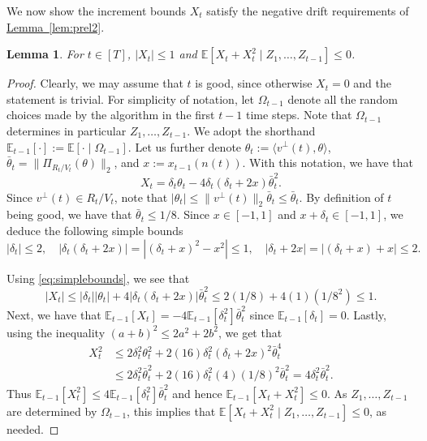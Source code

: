 \documentclass[11pt]{article}
\numberwithin{equation}{section}
\newtheorem{lemma}[theorem]{Lemma}
\theoremstyle{definition}
\theoremstyle{plain}
\newcommand{\expref}[2]{\hyperref[#2]{#1~\ref{#2}}}
\newcommand\E{\mathbb{E}}
\newcommand{\ip}[2]{\langle #1, #2 \rangle}
\begin{document}
We now show the increment bounds $X_t$ satisfy the negative drift
requirements of \expref{Lemma}{lem:prel2}.

\begin{lemma}
\label{lem:inc-reqs}
For $t \in [T]$, $|X_t| \leq 1$ and $\E[X_t+X_t^2\mid Z_1,\ldots,Z_{t-1}] \leq 0$.
\end{lemma}

\begin{proof}
Clearly, we may assume that $t$ is good, since otherwise $X_t = 0$ and the statement
is trivial. For simplicity of notation, let $\Omega_{t-1}$ denote all the random choices made
by the algorithm in the first $t-1$ time steps. Note that $\Omega_{t-1}$ determines in particular $Z_1,\ldots,Z_{t-1}$.
We
%
adopt the    %
%
shorthand $\E_{t-1}[\cdot] := \E[\cdot\mid \Omega_{t-1}]$. Let us further denote
$\theta_t := \ip{v^\perp(t)}{\theta}$, $\bar{\theta}_t =
\|\Pi_{R_t/V_t}(\theta)\|_2$, and $x := x_{t-1}(n(t))$. With this notation, we
have that
\[
X_t = \delta_t \theta_t - 4 \delta_t(\delta_t+2x) \bar{\theta}_t^2.
\]
Since $v^\perp(t) \in R_t/V_t$, note that $|\theta_t| \leq \|v^\perp(t)\|_2
\bar{\theta}_t \leq \bar{\theta}_t$. By definition of $t$ being good, we have that $\bar{\theta}_t
\leq 1/8$. Since $x \in [-1,1]$ and $x+\delta_t \in [-1,1]$, we deduce the
following simple bounds
\begin{equation}\label{eq:simplebounds}
|\delta_t| \leq 2, \quad |\delta_t(\delta_t+2x)| = |(\delta_t+x)^2-x^2| \leq 1,
\quad |\delta_t+2x| = |(\delta_t+x) + x| \leq 2.
\end{equation}

Using \eqref{eq:simplebounds}, we see that
\[
|X_t| \leq |\delta_t||\theta_t| + 4|\delta_t(\delta_t+2x)|\bar{\theta}_t^2
      \leq 2(1/8) + 4(1)(1/8^2) \leq 1.
\]
Next, we have that $\E_{t-1}[X_t] = - 4 \E_{t-1}[\delta_t^2] \bar{\theta}_t^2$
since $\E_{t-1}[\delta_t] = 0$. Lastly, using the inequality $(a+b)^2 \leq
2a^2+2b^2$, we get that
\begin{align*}
X_t^2 &\leq 2 \delta_t^2 \theta_t^2 + 2(16)\delta_t^2(\delta_t+2x)^2  \bar{\theta}_t^4 \\
      &\leq 2 \delta_t^2 \bar{\theta}_t^2 + 2(16) \delta_t^2 (4)(1/8)^2 \bar{\theta}_t^2
      = 4 \delta_t^2 \bar{\theta}_t^2.
\end{align*}
Thus $\E_{t-1}[X_t^2] \le 4 \E_{t-1}[\delta_t^2] \bar{\theta}_t^2$ and hence
$\E_{t-1}[X_t+X_t^2] \le 0$. As $Z_1,\ldots,Z_{t-1}$ are determined by $\Omega_{t-1}$,
this implies that $\E[X_t+X_t^2\mid Z_1,\ldots,Z_{t-1}] \leq 0$, as needed.
\end{proof}
\end{document}
